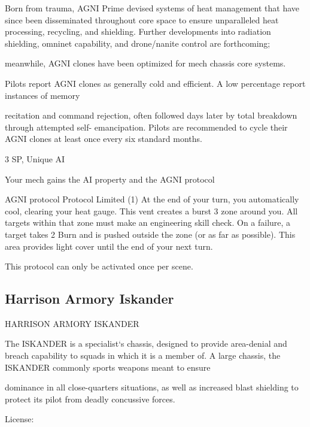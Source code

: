 Born from trauma, AGNI Prime devised systems of heat management that have since been disseminated  
throughout core space to ensure unparalleled heat processing, recycling, and shielding. Further  
developments into radiation shielding, omninet capability, and drone/nanite control are forthcoming;  

meanwhile, AGNI clones have been optimized for mech chassis core systems.  

Pilots report AGNI clones as generally cold and efficient. A low percentage report instances of memory  

recitation and command rejection, often followed days later by total breakdown through attempted self- 
emancipation. Pilots are recommended to cycle their AGNI clones at least once every six standard months.    

3 SP, Unique  
AI  

Your mech gains the AI property and the AGNI protocol
 
         AGNI protocol  
	        Protocol  
         Limited (1)  
         At the end of your turn, you automatically cool, clearing your heat gauge. This vent  
         creates a burst 3 zone around you. All targets within that zone must make an engineering  
         skill check. On a failure, a target takes 2 Burn and is pushed outside the zone (or as far as  
         possible). This area provides light cover until the end of your next turn.
 
         This protocol can only be activated once per scene.
 

                                                                                                                   
\subsection{Harrison Armory Iskander}

                              HARRISON ARMORY ISKANDER  

The ISKANDER is a specialist‘s chassis, designed to provide area-denial and breach capability to squads in  
which it is a member of. A large chassis, the ISKANDER commonly sports weapons meant to ensure  

dominance in all close-quarters situations, as well as increased blast shielding to protect its pilot from  
deadly concussive forces. 
 
                                                   License:
 
